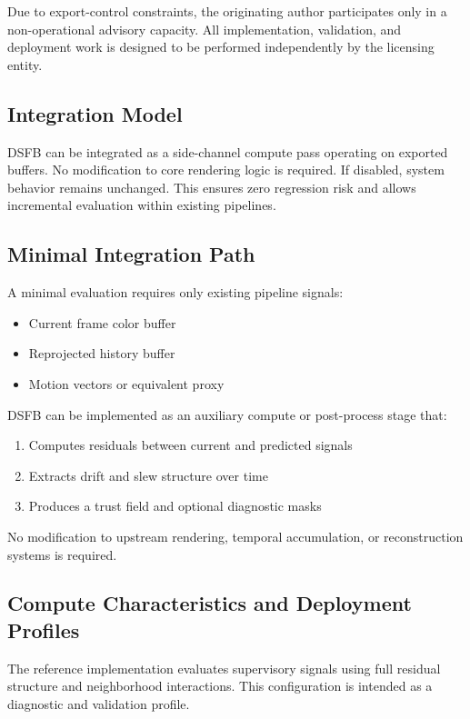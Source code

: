 \documentclass[11pt,letterpaper]{article}
\theoremstyle{gcresult}
\theoremstyle{definition}
\begin{document}
Due to export-control constraints, the originating author participates only in a non-operational advisory capacity. All implementation, validation, and deployment work is designed to be performed independently by the licensing entity.

\subsection{Integration Model}
DSFB can be integrated as a side-channel compute pass operating on exported buffers. No modification to core rendering logic is required. If disabled, system behavior remains unchanged. This ensures zero regression risk and allows incremental evaluation within existing pipelines.

\subsection{Minimal Integration Path}
A minimal evaluation requires only existing pipeline signals:
\begin{itemize}
    \item Current frame color buffer
    \item Reprojected history buffer
    \item Motion vectors or equivalent proxy
\end{itemize}

DSFB can be implemented as an auxiliary compute or post-process stage that:
\begin{enumerate}
    \item Computes residuals between current and predicted signals
    \item Extracts drift and slew structure over time
    \item Produces a trust field and optional diagnostic masks
\end{enumerate}

No modification to upstream rendering, temporal accumulation, or reconstruction systems is required.


\subsection{Compute Characteristics and Deployment Profiles}

The reference implementation evaluates supervisory signals using full residual structure and neighborhood interactions. This configuration is intended as a diagnostic and validation profile.
\end{document}

